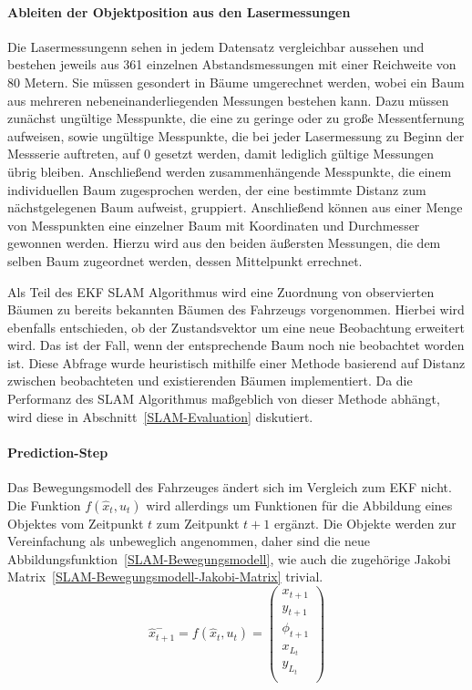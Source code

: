 \documentclass[11pt]{article}
\begin{document}
\paragraph{Ableiten der Objektposition aus den Lasermessungen}
Die Lasermessungenn sehen in jedem Datensatz vergleichbar aussehen und bestehen jeweils aus 361 einzelnen Abstandsmessungen mit einer Reichweite von 80 Metern. Sie müssen gesondert in Bäume umgerechnet werden, wobei ein Baum aus mehreren nebeneinanderliegenden Messungen bestehen kann. Dazu müssen zunächst ungültige Messpunkte, die eine zu geringe oder zu große Messentfernung aufweisen, sowie ungültige Messpunkte, die bei jeder Lasermessung zu Beginn der Messserie auftreten, auf 0 gesetzt werden, damit lediglich gültige Messungen übrig bleiben. Anschließend werden zusammenhängende Messpunkte, die einem individuellen Baum zugesprochen werden, der eine bestimmte Distanz zum nächstgelegenen Baum aufweist, gruppiert. Anschließend können aus einer Menge von Messpunkten eine einzelner Baum mit Koordinaten und Durchmesser gewonnen werden. Hierzu wird aus den beiden äußersten Messungen, die dem selben Baum zugeordnet werden, dessen Mittelpunkt errechnet.

Als Teil des EKF SLAM Algorithmus wird eine Zuordnung von observierten Bäumen zu bereits bekannten Bäumen des Fahrzeugs vorgenommen. Hierbei wird ebenfalls entschieden, ob der Zustandsvektor um eine neue Beobachtung erweitert wird. Das ist der Fall, wenn der entsprechende Baum noch nie beobachtet worden ist. Diese Abfrage wurde heuristisch mithilfe einer Methode basierend auf Distanz zwischen beobachteten und existierenden Bäumen implementiert. Da die Performanz des SLAM Algorithmus maßgeblich von dieser Methode abhängt, wird diese in Abschnitt~\ref{SLAM-Evaluation} diskutiert. 

\paragraph{Prediction-Step}
Das Bewegungsmodell des Fahrzeuges ändert sich im Vergleich zum EKF nicht. Die Funktion $f(\hat{x}_t, u_t)$ wird allerdings um Funktionen für die Abbildung eines Objektes vom Zeitpunkt $t$ zum Zeitpunkt $t+1$ ergänzt. Die Objekte werden zur Vereinfachung als unbeweglich angenommen, daher sind die neue Abbildungsfunktion~\ref{SLAM-Bewegungsmodell}, wie auch die zugehörige Jakobi Matrix~\eqref{SLAM-Bewegungsmodell-Jakobi-Matrix} trivial.
\begin{equation}\label{SLAM-Bewegungsmodell}
	\hat{x}_{t+1}^- = f(\hat{x}_{t},u_t) = \begin{pmatrix}
		x_{t+1} \\
		y_{t+1} \\
		\phi_{t+1} \\
		x_{L_t} \\
		y_{L_t} \\
	\end{pmatrix}
\end{equation}
\end{document}
